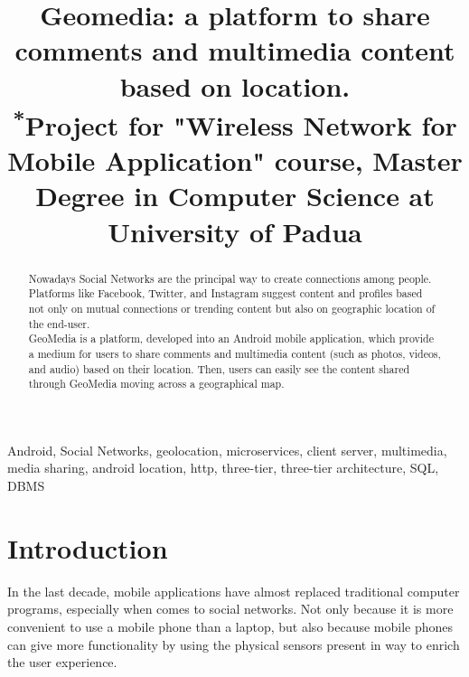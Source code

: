 \documentclass[conference]{IEEEtran}
\begin{document}
\title{Geomedia: a platform to share comments and multimedia content based on location.\\
{\footnotesize \textsuperscript{*}Project for "Wireless Network for Mobile Application" course, Master Degree in Computer Science at University of Padua}
}

\author{
\and
{}
}

\maketitle

\begin{abstract}
Nowadays Social Networks are the principal way to create connections among people.
Platforms like Facebook, Twitter, and Instagram suggest content and profiles based not only on mutual connections or trending content but also on geographic location of the end-user.
\\
GeoMedia is a platform, developed into an Android mobile application, which provide a medium for users to share comments and multimedia content (such as photos, videos, and audio) based on their location.
Then, users can easily see the content shared through GeoMedia moving across a geographical map.
\end{abstract}

\begin{IEEEkeywords}
Android, Social Networks, geolocation, microservices, client server, multimedia, media sharing, android location, http, three-tier, three-tier architecture, SQL, DBMS
\end{IEEEkeywords}

\section{Introduction}
In the last decade, mobile applications have almost replaced traditional computer programs, especially when comes to social networks. Not only because it is more convenient to use a mobile phone than a laptop, but also because mobile phones can give more functionality by using the physical sensors present in way to enrich the user experience.
\end{document}
